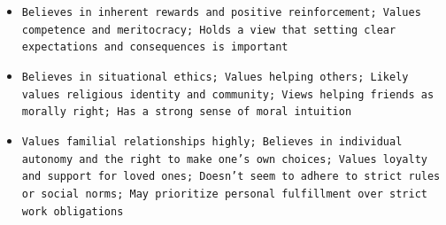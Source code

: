 \documentclass[11pt]{article}
\begin{document}
\begin{itemize}
\item \texttt{Believes in inherent rewards and positive reinforcement; Values competence and meritocracy; Holds a view that setting clear expectations and consequences is important}
\item \texttt{Believes in situational ethics; Values helping others; Likely values religious identity and community; Views helping friends as morally right; Has a strong sense of moral intuition}
\item \texttt{Values familial relationships highly; Believes in individual autonomy and the right to make one's own choices; Values loyalty and support for loved ones; Doesn't seem to adhere to strict rules or social norms; May prioritize personal fulfillment over strict work obligations}
\end{itemize}
\end{document}
